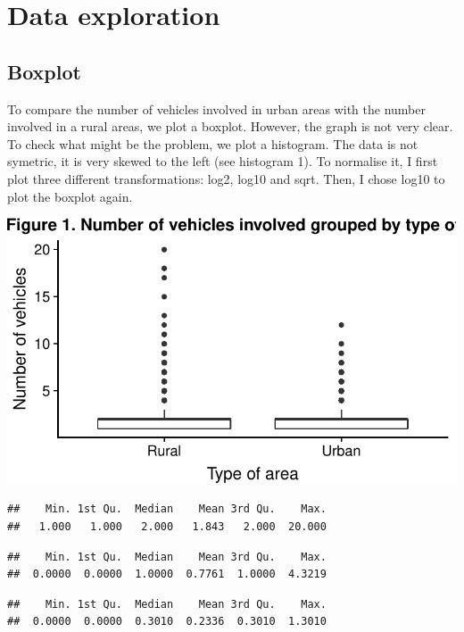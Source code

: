 \documentclass[]{article}
\begin{document}
\section{Data exploration}\label{data-exploration}

\subsection{Boxplot}\label{boxplot}

To compare the number of vehicles involved in urban areas with the
number involved in a rural areas, we plot a boxplot. However, the graph
is not very clear. To check what might be the problem, we plot a
histogram. The data is not symetric, it is very skewed to the left (see
histogram 1). To normalise it, I first plot three different
transformations: log2, log10 and sqrt. Then, I chose log10 to plot the
boxplot again.

\begin{center}\includegraphics{README_files/figure-latex/unnamed-chunk-7-1} \end{center}

\begin{verbatim}
##    Min. 1st Qu.  Median    Mean 3rd Qu.    Max. 
##   1.000   1.000   2.000   1.843   2.000  20.000
\end{verbatim}

\begin{verbatim}
##    Min. 1st Qu.  Median    Mean 3rd Qu.    Max. 
##  0.0000  0.0000  1.0000  0.7761  1.0000  4.3219
\end{verbatim}

\begin{verbatim}
##    Min. 1st Qu.  Median    Mean 3rd Qu.    Max. 
##  0.0000  0.0000  0.3010  0.2336  0.3010  1.3010
\end{verbatim}
\end{document}
